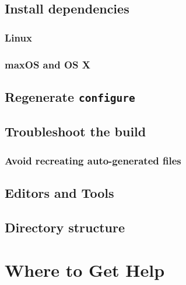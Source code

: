 \documentclass[]{book}
\begin{document}
\hypertarget{install-dependencies}{%
\section{Install dependencies}\label{install-dependencies}}

\hypertarget{linux}{%
\subsection{Linux}\label{linux}}

\hypertarget{maxos-and-os-x}{%
\subsection{maxOS and OS X}\label{maxos-and-os-x}}

\hypertarget{regenerate-configure}{%
\section{\texorpdfstring{Regenerate \texttt{configure}}{Regenerate configure}}\label{regenerate-configure}}

\hypertarget{troubleshoot-the-build}{%
\section{Troubleshoot the build}\label{troubleshoot-the-build}}

\hypertarget{avoid-recreating-auto-generated-files}{%
\subsection{Avoid recreating auto-generated files}\label{avoid-recreating-auto-generated-files}}

\hypertarget{editors-and-tools}{%
\section{Editors and Tools}\label{editors-and-tools}}

\hypertarget{directory-structure}{%
\section{Directory structure}\label{directory-structure}}

\hypertarget{where-to-get-help}{%
\chapter{Where to Get Help}\label{where-to-get-help}}
\end{document}
